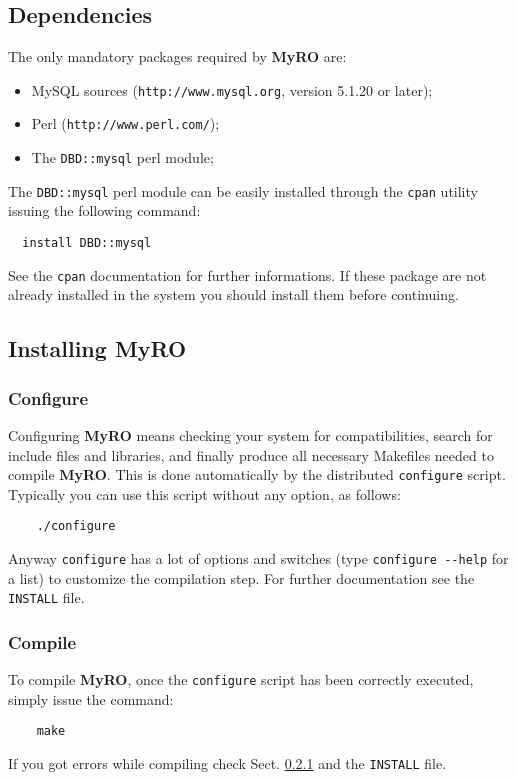 \documentclass[12pt,titlepage]{article}
\newcommand{\myro}{\textbf{MyRO} }
\newcommand{\myrO}{\textbf{MyRO}}
\begin{document}
\subsection{Dependencies}
\label{sec:Dependencies}
The only mandatory packages required by \myro are:

\begin{itemize}
\item MySQL sources (\verb|http://www.mysql.org|, version 5.1.20 or later);
\item Perl (\verb|http://www.perl.com/|);
\item The \verb|DBD::mysql| perl module;
\end{itemize}

\noindent
The \verb|DBD::mysql| perl module can be easily installed through the
\verb|cpan| utility issuing the following command:
%
\begin{verbatim}
  install DBD::mysql
\end{verbatim}
%
See the \verb|cpan| documentation for further informations. If these
package are not already installed in the system you should install
them before continuing.


\subsection{Installing \myro}
\label{sec:installing}

\subsubsection{Configure}
\label{sec:configuremyro}
Configuring \myro means checking your system for compatibilities,
search for include files and libraries, and finally produce all
necessary \textsf{Makefile}s needed to compile \myrO. This is done
automatically by the distributed \verb|configure| script. Typically
you can use this script without any option, as follows:

\begin{verbatim}
    ./configure
\end{verbatim}

\noindent
Anyway \verb|configure| has a lot of options and switches (type
\verb|configure --help| for a list) to customize the compilation step.
For further documentation see the \verb|INSTALL| file.

%
\subsubsection{Compile}
\label{sec:compilemyro}
To compile \myrO, once the \verb|configure| script has been correctly
executed, simply issue the command:
%
\begin{verbatim}
    make
\end{verbatim}
%
If you got errors while compiling check Sect. \ref{sec:configuremyro}
and the \verb|INSTALL| file.
\end{document}
